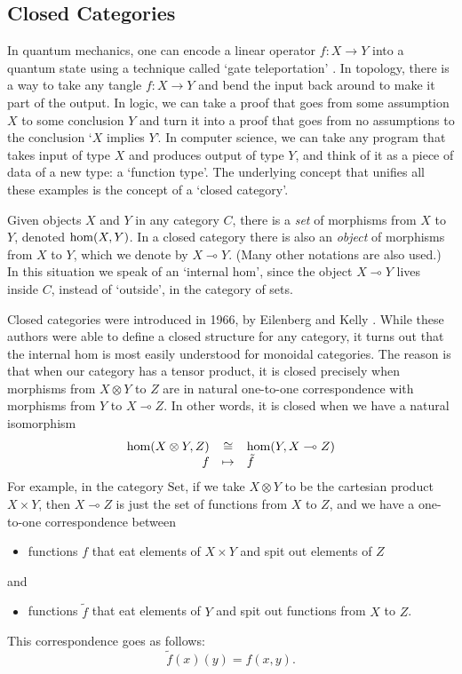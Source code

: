 \documentclass[12pt]{article}
\newcommand{\Set}{\mathrm{Set}}
\newcommand{\maps}{\colon}
\newcommand{\iso}{\cong}
\newcommand{\lhom}{\multimap}
\renewcommand{\hom}{{\rm hom}}
\newcommand{\tensor}{\otimes}
\begin{document}
\subsection{Closed Categories}
\label{closed}

In quantum mechanics, one can encode a linear operator $f \maps X \to
Y$ into a quantum state using a technique called `gate teleportation'
\cite{GC}.  In topology, there is a way to take any tangle $f \maps X
\to Y$ and bend the input back around to make it part of the output.
In logic, we can take a proof that goes from some assumption $X$ to
some conclusion $Y$ and turn it into a proof that goes from no
assumptions to the conclusion `$X$ implies $Y$'.  In computer science,
we can take any program that takes input of type $X$ and produces
output of type $Y$, and think of it as a piece of data of a new type:
a `function type'.  The underlying concept that unifies all these
examples is the concept of a `closed category'.

Given objects $X$ and $Y$ in any category $C$, there is a {\em set} of
morphisms from $X$ to $Y$, denoted $\hom(X,Y)$.  In a closed category
there is also an {\em object} of morphisms from $X$ to $Y$, which we
denote by $X \lhom Y$.  (Many other notations are also used.)  In this
situation we speak of an `internal hom', since the object $X \lhom Y$
lives inside $C$, instead of `outside', in the category of sets.

Closed categories were introduced in 1966, by Eilenberg and Kelly \cite{EK}.
While these authors were able to define a closed structure for any
category, it turns out that the internal hom is most easily understood
for monoidal categories.  The reason is that when our category has
a tensor product, it is closed precisely when morphisms from $X \tensor Y$
to $Z$ are in natural one-to-one correspondence with morphisms from $Y$
to $X \lhom Z$.  In other words, it is closed when we have a natural
isomorphism
\[  
\begin{array}{rcl}       
 \hom(X \tensor Y , Z) &\iso & \hom(Y, X \lhom Z)  \\
                    f &\mapsto & \tilde{f}  
\end{array}
\]
For example, in the category $\Set$, if we take
$X \tensor Y$ to be the cartesian product $X \times Y$, then 
$X \lhom Z$ is just the set of functions from $X$ to $Z$, and we 
have a one-to-one correspondence between
\begin{itemize}
\item functions $f$ that eat elements of
$X \times Y$ and spit out elements of $Z$ 
\end{itemize}
and 
\begin{itemize}
\item
functions $\tilde{f}$ that eat elements of $Y$ and spit out 
functions from $X$ to $Z$.
\end{itemize}
This correspondence goes as follows:
\[          \tilde{f}(x)(y) = f(x,y)  .\]
\end{document}
